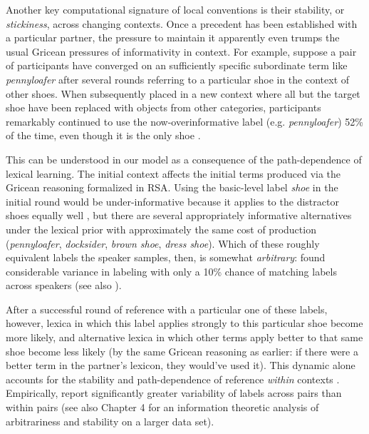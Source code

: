 Another key computational signature of local conventions is their stability, or \emph{stickiness}, across changing contexts. Once a precedent has been established with a particular partner, the pressure to maintain it apparently even trumps the usual Gricean pressures of informativity in context. For example, suppose a pair of participants have converged on an sufficiently specific subordinate term like \emph{pennyloafer} after several rounds referring to a particular shoe in the context of other shoes. %
When subsequently placed in a new context where all but the target shoe have been replaced with objects from other categories, participants remarkably continued to use the now-overinformative label (e.g. \emph{pennyloafer}) 52\% of the time, even though it is the only shoe \cite{BrennanClark96_ConceptualPactsConversation}.

This can be understood in our model as a consequence of the path-dependence of lexical learning. The initial context affects the initial terms produced via the Gricean reasoning formalized in RSA. Using the basic-level label \emph{shoe} in the initial round would be under-informative because it applies to the distractor shoes equally well \cite{GrafEtAl16_BasicLevel}, but there are several appropriately informative alternatives under the lexical prior with approximately the same cost of production (\emph{pennyloafer}, \emph{docksider}, \emph{brown shoe}, \emph{dress shoe}). Which of these roughly equivalent labels the speaker samples, then, is somewhat \emph{arbitrary}:  found considerable variance in labeling with only a 10\% chance of matching labels across speakers (see also ). 

After a successful round of reference with a particular one of these labels, however, lexica in which this label applies strongly to this particular shoe become more likely, and alternative lexica in which other terms apply better to that same shoe become less likely (by the same Gricean reasoning as earlier: if there were a better term in the partner's lexicon, they would've used it). This dynamic alone accounts for the stability and path-dependence of reference \emph{within} contexts \cite{HawkinsFrankGoodman17_ConventionFormation}. Empirically,  report significantly greater variability of labels across pairs than within pairs (see also Chapter 4 for an information theoretic analysis of arbitrariness and stability on a larger data set). 

